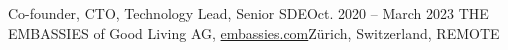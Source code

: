 \resumeSubheading
{Co-founder, CTO, Technology Lead, Senior SDE}{Oct. 2020 -- March 2023}
{THE EMBASSIES of Good Living AG, \href{https://embassies.com}{embassies.com}}{Zürich, Switzerland, REMOTE}
\resumeItemListStart
\resumeItemListEnd